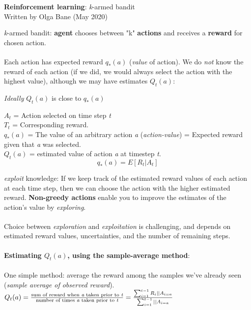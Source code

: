\documentclass{article} %
\begin{document}
\begin{center}{\bf Reinforcement learning}: \emph{k}-armed bandit\\
Written by Olga Bane (May 2020)\end{center}
\vspace*{30pt}
\noindent\emph{k}-armed bandit: {\bf agent} chooses between "k" {\bf actions} and receives a {\bf reward} for chosen action.\\\\
Each action has expected reward  $q_{*}(a)$ ({\it value} of action).  We do {\it not} know the reward of each action (if we did, we would always select the action with the highest value), although we may have estimates $Q_{t}(a)$:

\begin{center} {\it Ideally} $Q_{t}(a)$ is close to $q_{*}(a)$\end{center}

\noindent
$A_{t}$ = Action selected on time step {\it t} \\
$T_{t}$ = Corresponding reward. \\
$q_{*}(a)$ = The value of an arbitrary action {\it a} ({\it action-value})  = Expected reward given that {\it a} was selected. \\
$Q_{t}(a)$ = estimated value of action {\it a} at timestep {\it t}. \\

\[q_{*}(a) = E[R_{t} | A_{t}]\]

 {\it exploit} knowledge: If we keep track of the estimated reward values of each action at each time step, then we can choose the action with the higher estimated reward. {\bf Non-greedy actions} enable you to improve the estimates of the action's value by {\it exploring}.
\\\\
Choice between {\it exploration} and {\it exploitation} is challenging, and depends on estimated reward values, uncertainties, and the number of remaining steps. 
\\\\
{\bf Estimating $Q_{t}(a)$, using the sample-average method}:
\\\\
One simple method: average the reward among the samples we've already seen ({\it sample average of observed reward}).\\

$Q_{t}(a) = \frac{\textrm{sum of reward when {\it a} taken prior to {\it t}}}
			{\textrm{number of times {\it a} taken prior to {\it t}}}
		= \frac{\sum_{i=1}^{t-1} R_i || A_{i=a}}{\sum_{i=1}^{t-1} || A_{i=a}}$\\
\end{document}
